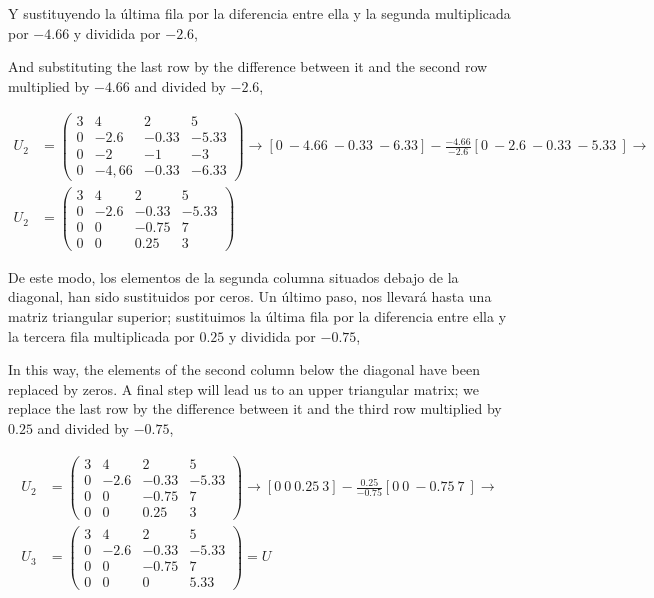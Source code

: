 \begin{paracol}{2}
Y sustituyendo la última fila por  la diferencia entre ella y la segunda multiplicada por $-4.66$ y dividida por $-2.6$,

\switchcolumn
And substituting the last row by the difference between it and the second row multiplied by $-4.66$ and divided by $-2.6$,
\end{paracol}


\begin{align*}
U_2 &=\begin{pmatrix}
3& 4& 2&5\\
0& -2.6& -0.33& -5.33\\
0& -2& -1& -3\\
0& -4,66& -0.33& -6.33
\end{pmatrix} \rightarrow [0\ -4.66\ -0.33\ -6.33]-\frac{-4.66}{-2.6} [0\ -2.6\ -0.33\ -5.33\ ] \rightarrow \\
 U_2 &=\begin{pmatrix}
3& 4& 2&5\\
0& -2.6& -0.33& -5.33\\
0& 0& -0.75& 7\\
0& 0& 0.25& 3
\end{pmatrix}
\end{align*}

\begin{paracol}{2}
De este modo, los elementos de la segunda columna situados debajo de la diagonal, han sido sustituidos por ceros. Un último paso, nos llevará hasta una matriz triangular superior; sustituimos la última fila por la diferencia entre ella y la tercera fila multiplicada por $0.25$ y dividida por $-0.75$,

\switchcolumn
In this way, the elements of the second column below the diagonal have been replaced by zeros. A final step will lead us to an upper triangular matrix; we replace the last row by the difference between it and the third row multiplied by $0.25$ and divided by $-0.75$,
\end{paracol}

\begin{align*}
 U_2 &=\begin{pmatrix}
3& 4& 2&5\\
0& -2.6& -0.33& -5.33\\
0& 0& -0.75& 7\\
0& 0& 0.25& 3
\end{pmatrix} \rightarrow [0\ 0\ 0.25\ 3]-\frac{0.25}{-0.75} [0\ 0\ -0.75\ 7\ ] \rightarrow \\
 U_3 &=\begin{pmatrix}
3& 4& 2&5\\
0& -2.6& -0.33& -5.33\\
0& 0& -0.75& 7\\
0& 0& 0& 5.33
\end{pmatrix}=U
\end{align*}

